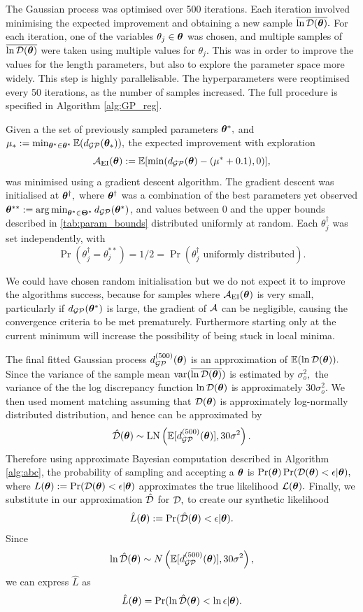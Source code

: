 The Gaussian process was optimised over 500 iterations. Each iteration involved
minimising the expected improvement and obtaining a new sample $\overline{\ln\mathcal{D}(\bm{\theta})}.$
For each iteration, one of the variables $\theta_j \in \bm{\theta}$ was chosen, and
multiple samples of $\overline{\ln\mathcal{D}(\bm{\theta})}$ were taken using multiple values for $\theta_j.$
This was in order to improve the values for the length parameters, but
also to explore the parameter space more widely. This step is highly
parallelisable.
The hyperparameters were
reoptimised every 50 iterations, as the number of samples increased. The full
procedure is specified in Algorithm \ref{alg:GP_reg}.

Given a the set of previously sampled parameters $\bm{\theta}^\ast,$ and 
$\mu_* := \min_{\bm{\theta}^\ast\in\bm{\theta}^\ast}\operatorname{\mathbb{E}}(d_{\mathcal{GP}}(\bm{\theta}_\ast)),$
the expected improvement with exploration
$$
        \mathcal{A}_{\mathrm{EI}}(\bm{\theta})
        := \operatorname{\mathbb{E}}[\min(d_{\mathcal{GP}}(\bm{\theta}) - (\mu^\ast + 0.1), 0)],
$$
was minimised using a gradient descent algorithm. The gradient descent was
initialised at $\bm{\theta}^\dagger,$ where $\bm{\theta}^\dagger$ was a
combination of the best parameters yet observed
$\bm{\theta}^{**} := \operatorname*{arg\,min}_{\bm{\theta}^\ast\in\bm{\Theta}^\ast} d_{\mathcal{GP}}(\bm{\theta}^\ast)$,
and values between 0 and the upper bounds described in \ref{tab:param_bounds}
distributed uniformly at random. Each $\theta_j^\dagger$ was set independently,
with
$$
    \Pr(\theta_j^\dagger = \theta_j^{**})
    = 1/2
    = \Pr(\theta_j^\dagger \text{ uniformly distributed}).
$$

We could have chosen random initialisation but we do not expect it to improve 
the algorithms success, because for samples where 
$\mathcal{A}_{\mathrm{EI}}(\bm{\theta})$ is very small, particularly if
$d_{\mathcal{GP}}(\bm{\theta}^\ast)$ is
large, the gradient of $\mathcal{A}$ can be negligible, causing the convergence criteria
to be met prematurely.
Furthermore starting only at the current minimum will 
increase the possibility of being stuck in local minima.

The final fitted Gaussian process 
$d_{\mathcal{GP}}^{(500)}(\bm{\theta})$ is an approximation of $\operatorname{\mathbb{E}}(\ln\mathcal{D}(\bm{\theta})).$ Since the
variance of the sample mean $\operatorname{var}(\overline{\ln\mathcal{D}(\bm{\theta})})$ is estimated by $\sigma_o^2,$ the
variance of the the log discrepancy function $\ln\mathcal{D}(\bm{\theta})$ is
approximately $30\sigma_o^2.$ We then used moment matching assuming that
$\mathcal{D}(\bm{\theta})$ is approximately log-normally distributed
distribution, and hence can be approximated by
$$
    \hat{\mathcal{D}}(\bm{\theta}) \sim
    \operatorname{LN}\left(\operatorname{\mathbb{E}}[d_{\mathcal{GP}}^{(500)}(\bm{\theta})], 30 \sigma^2\right).
$$
Therefore using approximate Bayesian computation described in
Algorithm \ref{alg:abc}, the probability of sampling
and accepting a $\bm{\theta}$ is
$\Pr(\bm{\theta})\Pr(\mathcal{D}(\bm{\theta}) < \epsilon | \bm{\theta}),$ where
$L(\bm{\theta}):=\Pr(\mathcal{D}(\bm{\theta}) < \epsilon | \bm{\theta})$ approximates the true
likelihood $\operatorname{\mathcal{L}}(\bm{\theta}).$
Finally, we substitute in our approximation $\hat{\mathcal{D}}$ for $\mathcal{D},$ to create our
synthetic likelihood
\begin{align}
        \hat{L}(\bm{\theta}) := \Pr(\hat{\mathcal{D}}(\bm{\theta}) < \epsilon | \bm{\theta}).
        \label{eq:fin_lik}
\end{align}
Since
$$
    \ln\hat{\mathcal{D}}(\bm{\theta})
    \sim N\left(\operatorname{\mathbb{E}}[d_{\mathcal{GP}}^{(500)}(\bm{\theta})], 30 \sigma^2\right),
$$
we can express $\hat{L}$ as
$$
    \hat{L}(\bm{\theta}) =\Pr(\ln\hat{\mathcal{D}}(\bm{\theta}) < \ln\epsilon | \bm{\theta}).
$$

